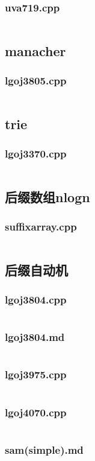 \documentclass[a4paper,landscape,twocolumn]{article} %
\begin{document}
\subsubsection{uva719.cpp}
\inputminted{c++}{./codes/019}
\subsection{manacher}
\subsubsection{lgoj3805.cpp}
\inputminted{c++}{./codes/020}
\subsection{trie}
\subsubsection{lgoj3370.cpp}
\inputminted{c++}{./codes/021}
\subsection{后缀数组nlogn}
\subsubsection{suffixarray.cpp}
\inputminted{c++}{./codes/022}
\subsection{后缀自动机}
\subsubsection{lgoj3804.cpp}
\inputminted{c++}{./codes/023}
\subsubsection{lgoj3804.md}
\inputminted{text}{./codes/024}
\subsubsection{lgoj3975.cpp}
\inputminted{c++}{./codes/025}
\subsubsection{lgoj4070.cpp}
\inputminted{c++}{./codes/026}
\subsubsection{sam(simple).md}
\inputminted{text}{./codes/027}
\end{document}
